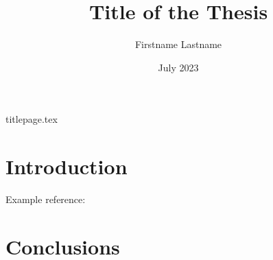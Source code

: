 \documentclass[a4paper,12pt,twoside]{report} %
\author{Firstname Lastname}
\title{Title of the Thesis}
\date{July 2023}
\begin{document}
\begin{titlepage}
{titlepage.tex}
\end{titlepage}

\section{Introduction}

Example reference: \autocite{sigfridsson}

\section{Conclusions}



\nocite{*}
\printbibliography
\end{document}
